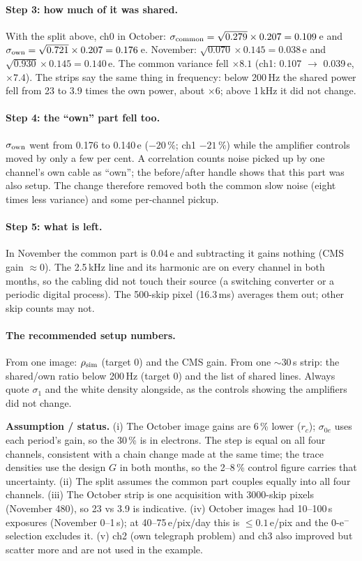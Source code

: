 \documentclass[10pt,a4paper]{article}
\newcommand{\caveat}[1]{\par\smallskip\noindent\colorbox{orange!10}{\parbox{\dimexpr\linewidth-2\fboxsep}{\small\textbf{Assumption / status.} #1}}\par\smallskip}
\begin{document}
\paragraph{Step 3: how much of it was shared.} With the split above, ch0 in October:
$\sigma_{\rm common}=\sqrt{0.279}\times0.207=0.109$\,e and $\sigma_{\rm own}=\sqrt{0.721}\times0.207=0.176$\,e.
November: $\sqrt{0.070}\times0.145=0.038$\,e and $\sqrt{0.930}\times0.145=0.140$\,e. The common variance fell
$\times8.1$ (ch1: 0.107 $\to$ 0.039\,e, $\times7.4$). The strips say the same thing in frequency: below 200\,Hz the
shared power fell from 23 to 3.9 times the own power, about $\times6$; above 1\,kHz it did not change.

\paragraph{Step 4: the ``own'' part fell too.} $\sigma_{\rm own}$ went from 0.176 to 0.140\,e ($-20\,\%$; ch1 $-21\,\%$)
while the amplifier controls moved by only a few per cent. A correlation counts noise picked up by one channel's own
cable as ``own''; the before/after handle shows that this part was also setup. The change therefore removed both the
common slow noise (eight times less variance) and some per-channel pickup.

\paragraph{Step 5: what is left.} In November the common part is 0.04\,e and subtracting it gains nothing (CMS gain
$\approx0$). The 2.5\,kHz line and its harmonic are on every channel in both months, so the cabling did not touch
their source (a switching converter or a periodic digital process). The 500-skip pixel (16.3\,ms) averages them out;
other skip counts may not.

\paragraph{The recommended setup numbers.} From one image: $\rho_{\rm sim}$ (target 0) and the CMS gain. From one
$\sim$30\,s strip: the shared/own ratio below 200\,Hz (target 0) and the list of shared lines. Always quote $\sigma_1$
and the white density alongside, as the controls showing the amplifiers did not change.
\caveat{(i) The October image gains are 6\,\% lower ($r_c$); $\sigma_{0e}$ uses each period's gain, so the 30\,\% is in
electrons. The step is equal on all four channels, consistent with a chain change made at the same time; the trace
densities use the design $G$ in both months, so the 2--8\,\% control figure carries that uncertainty. (ii) The split
assumes the common part couples equally into all four channels. (iii) The October strip is one acquisition with
3000-skip pixels (November 480), so 23 vs 3.9 is indicative. (iv) October images had 10--100\,s exposures (November
0--1\,s); at 40--75\,e/pix/day this is $\le0.1$\,e/pix and the 0-e$^-$ selection excludes it. (v) ch2 (own telegraph
problem) and ch3 also improved but scatter more and are not used in the example.}
\end{document}
